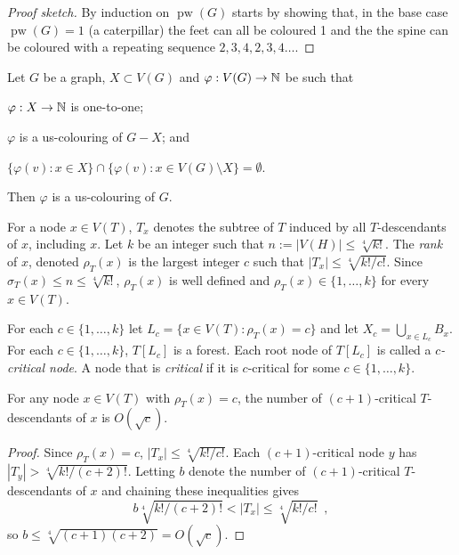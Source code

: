\documentclass[kpfonts]{patmorin}
\DeclareMathOperator{\pw}{pw}
\begin{document}
\begin{proof}[Proof sketch]
    By induction on $\pw(G)$ starts by showing that, in the base case $\pw(G)=1$ (a caterpillar) the feet can all be coloured 1 and the the spine can be coloured with a repeating sequence $2,3,4,2,3,4\ldots$.
\end{proof}


\begin{obs}\label{colour-partition}
    Let $G$ be a graph, $X\subset V(G)$ and $\varphi:V(G)\to\mathbb{N}$ be such that
    \begin{compactenum}
        \item $\varphi:X\to\mathbb{N}$ is one-to-one;
        \item $\varphi$ is a us-colouring of $G-X$; and
        \item $\{\varphi(v):x\in X\} \cap \{\varphi(v):x\in V(G)\setminus X\} =\emptyset$.
    \end{compactenum}
    Then $\varphi$ is a us-colouring of $G$.
\end{obs}

For a node $x\in V(T)$, $T_x$ denotes the subtree of $T$ induced by all $T$-descendants of $x$, including $x$. Let $k$ be an integer such that $n:=|V(H)|\le \sqrt[4]{k!}$. The \emph{rank} of $x$, denoted $\rho_T(x)$ is the largest integer $c$ such that $|T_x| \le \sqrt[4]{k!/c!}$.  Since $\sigma_T(x) \le n \le \sqrt[4]{k!}$, $\rho_T(x)$ is well defined and $\rho_T(x)\in\{1,\ldots,k\}$ for every $x\in V(T)$.

For each $c\in\{1,\ldots,k\}$ let $L_c=\{x\in V(T):\rho_T(x) = c\}$ and let $X_c=\bigcup_{x\in L_c} B_x$.  For each $c\in\{1,\ldots,k\}$, $T[L_c]$ is a forest. Each root node of $T[L_c]$ is called a \emph{$c$-critical node}.  A node that is \emph{critical} if it is $c$-critical for some $c\in\{1,\ldots,k\}$.

\begin{lem}\label{descendant-count}
    For any node $x\in V(T)$ with $\rho_T(x)=c$, the number of $(c+1)$-critical $T$-descendants of $x$ is $O(\sqrt{c})$.
\end{lem}

\begin{proof}
    Since $\rho_T(x)=c$, $|T_x|\le \sqrt[4]{k!/c!}$.  Each $(c+1)$-critical node $y$ has $|T_y|> \sqrt[4]{k!/(c+2)!}$.  Letting $b$ denote the number of $(c+1)$-critical $T$-descendants of $x$ and chaining these inequalities gives
    \[
        b\sqrt[4]{k!/(c+2)!} < |T_x| \le \sqrt[4]{k!/c!} \enspace ,
    \]
    so $b \le \sqrt[4]{(c+1)(c+2)}=O(\sqrt{c})$.
\end{proof}
\end{document}
